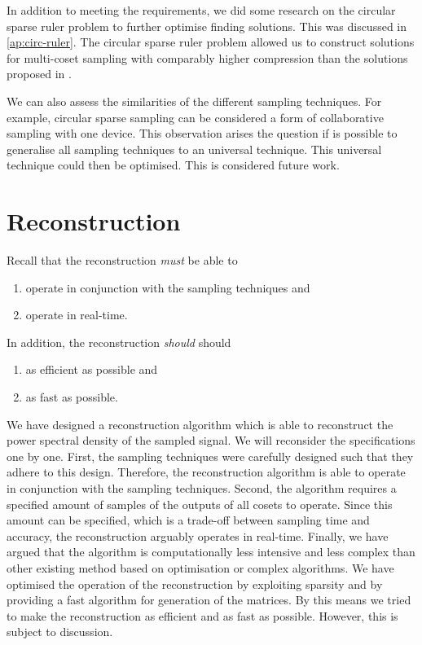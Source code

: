 \documentclass[a4paper, openany, oneside]{memoir}
\begin{document}
In addition to meeting the requirements, we did some research on the circular sparse ruler problem to further optimise finding solutions. This was discussed in \cref{ap:circ-ruler}. The circular sparse ruler problem allowed us to construct solutions for multi-coset sampling with comparably higher compression than the solutions proposed in \cite{ariananda2012compressive}.


We can also assess the similarities of the different sampling techniques. For example, circular sparse sampling can be considered a form of collaborative sampling with one device. This observation arises the question if is possible to generalise all sampling techniques to an universal technique. This universal technique could then be optimised. This is considered future work.  


\section{Reconstruction}
Recall that the reconstruction \textit{must} be able to
\begin{enumerate}
    \item operate in conjunction with the sampling techniques and
    \item operate in real-time.
\end{enumerate}
In addition, the reconstruction \textit{should} should
\begin{enumerate}
    \item as efficient as possible and
    \item as fast as possible.
\end{enumerate}

We have designed a reconstruction algorithm which is able to reconstruct the power spectral density of the sampled signal. We will reconsider the specifications one by one. First, the sampling techniques were carefully designed such that they adhere to this design. Therefore, the reconstruction algorithm is able to operate in conjunction with the sampling techniques. Second, the algorithm requires a specified amount of samples of the outputs of all cosets to operate. Since this amount can be specified, which is a trade-off between sampling time and accuracy, the reconstruction arguably operates in real-time. Finally, we have argued that the algorithm is computationally less intensive and less complex than other existing method based on optimisation or complex algorithms. We have optimised the operation of the reconstruction by exploiting sparsity and by providing a fast algorithm for generation of the matrices. By this means we tried to make the reconstruction as efficient and as fast as possible. However, this is subject to discussion.
\end{document}
